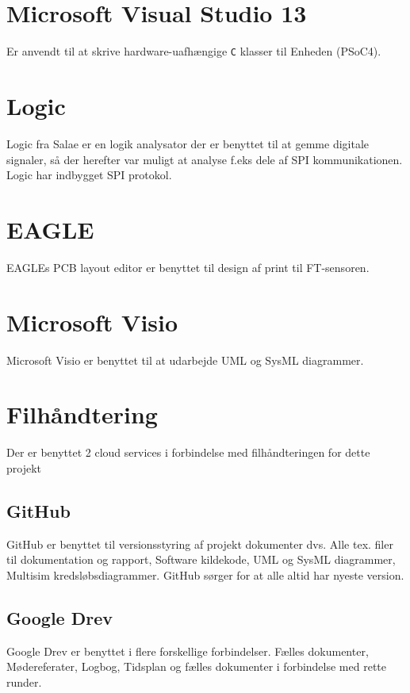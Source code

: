 \section{Microsoft Visual Studio 13}
Er anvendt til at skrive hardware-uafhængige \verb+C+ klasser til Enheden (PSoC4).

\section{Logic}
Logic fra Salae er en logik analysator der er benyttet til at gemme digitale signaler, så der herefter var muligt at analyse f.eks dele af SPI kommunikationen. Logic har indbygget SPI protokol.

\section{EAGLE}
EAGLEs PCB layout editor er benyttet til design af print til FT-sensoren.

\section{Microsoft Visio}
Microsoft Visio er benyttet til at udarbejde UML og SysML diagrammer. 

\section{Filhåndtering}
Der er benyttet 2 cloud services i forbindelse med filhåndteringen for dette projekt

\subsection{GitHub}
GitHub er benyttet til versionsstyring af projekt dokumenter dvs. Alle tex. filer til dokumentation og rapport, Software kildekode, UML og SysML diagrammer, Multisim kredsløbsdiagrammer. GitHub sørger for at alle altid har nyeste version. 

\subsection{Google Drev}
Google Drev er benyttet i flere forskellige forbindelser. Fælles dokumenter, Mødereferater, Logbog, Tidsplan og fælles dokumenter i forbindelse med rette runder.


